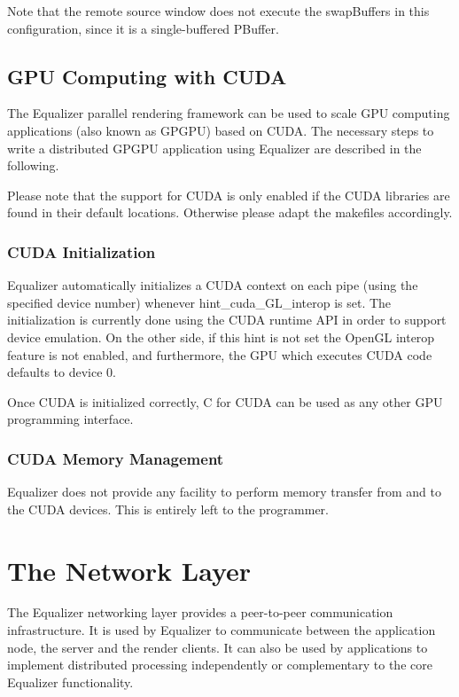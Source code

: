 \documentclass[10pt,a4]{scrartcl}
\begin{document}
Note that the remote source window does not execute the swapBuffers in
this configuration, since it is a single-buffered PBuffer.

\subsection{\label{sCUDA}GPU Computing with CUDA}

The Equalizer parallel rendering framework can be used to scale GPU 
computing applications (also known as GPGPU) based on CUDA. The necessary
steps to write a distributed GPGPU application using Equalizer are described
in the following.

Please note that the support for CUDA is only enabled if the CUDA libraries are found
in their default locations. Otherwise please adapt the makefiles accordingly.

\subsubsection{CUDA Initialization}

Equalizer automatically initializes a CUDA context on each pipe (using the specified
device number) whenever \textsf{hint\_cuda\_GL\_interop} is set. The initialization is 
currently done using the CUDA runtime API in order to support device emulation. 
On the other side, if this hint is not set the OpenGL interop feature is not enabled, and 
furthermore, the GPU which executes CUDA code defaults to device 0.

Once CUDA is initialized correctly, C for CUDA can be used as any other GPU 
programming interface. 

\subsubsection{CUDA Memory Management}

Equalizer does not provide any facility to perform memory transfer from and to the CUDA
devices. This is entirely left to the programmer.

\section{\label{sNetwork}The Network Layer}

The Equalizer networking layer provides a peer-to-peer communication
infrastructure. It is used by Equalizer to communicate between the
application node, the server and the render clients. It can also be
used by applications to implement distributed processing independently
or complementary to the core Equalizer functionality.
\end{document}
